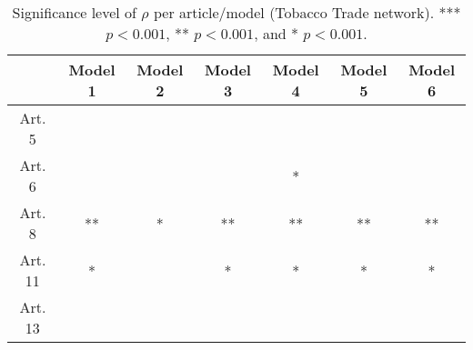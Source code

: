 \begin{table}[ht]
\centering
\begin{tabular}{ccccccc}
  \toprule
 & Model 1 & Model 2 & Model 3 & Model 4 & Model 5 & Model 6 \\ 
  \midrule
Art. 5 &   &   &   &   &   &   \\ 
   \midrule
Art. 6 &   &   &   & * &   &   \\ 
   \midrule
Art. 8 & ** & * & ** & ** & ** & ** \\ 
   \midrule
Art. 11 & * &   & * & * & * & * \\ 
   \midrule
Art. 13 &   &   &   &   &   &   \\ 
   \bottomrule
\end{tabular}
\caption{Significance level of $\rho$ per article/model (Tobacco Trade network). *** $p < 0.001$, ** $p < 0.001$, and * $p < 0.001$.} 
\end{table}
